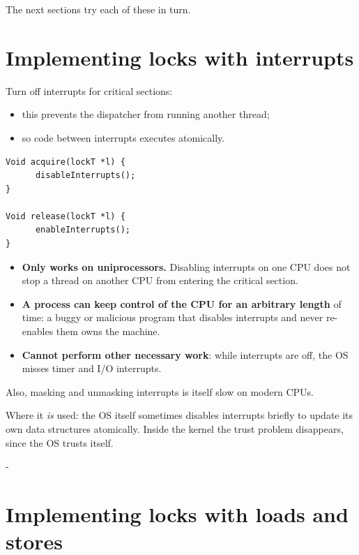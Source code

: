 \documentclass[11pt,a4paper]{article}
\makeatletter
\newcommand{\keepspace}[1]{\par\penalty-100\begingroup
  \setlength{\dimen@}{#1}\dimen@ii\pagegoal\advance\dimen@ii-\pagetotal
  \ifdim\dimen@>\dimen@ii\ifdim\dimen@ii>\z@\vfil\fi\break\fi\endgroup}
\makeatother
\begin{document}
The next sections try each of these in turn.

\section{Implementing locks with interrupts}

Turn off interrupts for critical sections:
\begin{itemize}
  \item this prevents the dispatcher from running another thread;
  \item so code between interrupts executes atomically.
\end{itemize}

\begin{lstlisting}
Void acquire(lockT *l) {
      disableInterrupts();
}

Void release(lockT *l) {
      enableInterrupts();
}
\end{lstlisting}

\begin{warnbox}[Disadvantages??]
\begin{itemize}
  \item \textbf{Only works on uniprocessors.} Disabling interrupts on one
        CPU does not stop a thread on another CPU from entering the
        critical section.
  \item \textbf{A process can keep control of the CPU for an arbitrary
        length} of time: a buggy or malicious program that disables
        interrupts and never re-enables them owns the machine.
  \item \textbf{Cannot perform other necessary work}: while interrupts are
        off, the OS misses timer and I/O interrupts.
\end{itemize}
Also, masking and unmasking interrupts is itself slow on modern CPUs.

Where it \emph{is} used: the OS itself sometimes disables interrupts briefly
to update its own data structures atomically. Inside the kernel the trust
problem disappears, since the OS trusts itself.
\end{warnbox}

\keepspace{20\baselineskip}
\section{Implementing locks with loads and stores}
\end{document}
